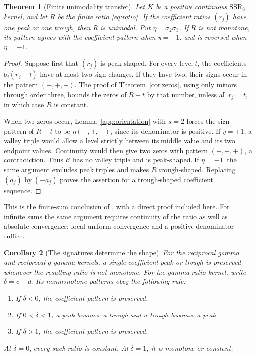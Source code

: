 \documentclass[11pt,a4paper]{article}
\newtheorem{theorem}{Theorem}[section]
\newtheorem{corollary}[theorem]{Corollary}
\theoremstyle{definition}
\theoremstyle{remark}
\newcommand{\SSR}{\mathrm{SSR}}
\begin{document}
\begin{theorem}[Finite unimodality transfer]\label{app:unimodality}
Let \(K\) be a positive continuous \(\SSR_3\) kernel, and let
\(R\) be the finite ratio \eqref{eq:ratio}. If the coefficient ratios
\((r_j)\) have one peak or one trough, then \(R\) is unimodal.
Put \(\eta=\sigma_2\sigma_3\). If \(R\) is not monotone, its
pattern agrees with the coefficient pattern when \(\eta=+1\), and
is reversed when \(\eta=-1\).
\end{theorem}

\begin{proof}
Suppose first that \((r_j)\) is peak-shaped. For every level \(t\),
the coefficients \(b_j(r_j-t)\) have at most two sign changes.
If they have two, their signs occur in the pattern \((-,+,-)\).
The proof of Theorem~\ref{cor:zeros}, using only minors through
order three, bounds the zeros of \(R-t\) by that number, unless
all \(r_j=t\), in which case \(R\) is constant.

When two zeros occur, Lemma~\ref{app:orientation} with \(s=2\)
forces the sign pattern of \(R-t\) to be
\(\eta(-,+,-)\), since its denominator is positive.
If \(\eta=+1\), a valley triple would allow a level strictly
between its middle value and its two endpoint values. Continuity
would then give two zeros with pattern \((+,-,+)\), a contradiction.
Thus \(R\) has no valley triple and is peak-shaped. If \(\eta=-1\),
the same argument excludes peak triples and makes \(R\) trough-shaped.
Replacing \((a_j)\) by \((-a_j)\) proves the assertion for a
trough-shaped coefficient sequence.
\end{proof}

This is the finite-sum conclusion of \cite[Theorem~2.5]{KVZ}, with
a direct proof included here. For infinite sums the same argument
requires continuity of the ratio as well as absolute convergence;
local uniform convergence and a positive denominator suffice.

\begin{corollary}[The signatures determine the shape]
\label{cor:unimodal}
For the reciprocal gamma and reciprocal \(q\)-gamma kernels, a
single coefficient peak or trough is preserved whenever the resulting
ratio is not monotone. For the gamma-ratio kernel, write \(\delta=c-d\).
Its nonmonotone patterns obey the following rule:
\begin{enumerate}[label=\textnormal{(\roman*)}]
\item If \(\delta<0\), the coefficient pattern is preserved.
\item If \(0<\delta<1\), a peak becomes a trough and a trough
becomes a peak.
\item If \(\delta>1\), the coefficient pattern is preserved.
\end{enumerate}
At \(\delta=0\), every such ratio is constant. At \(\delta=1\),
it is monotone or constant.
\end{corollary}
\end{document}

